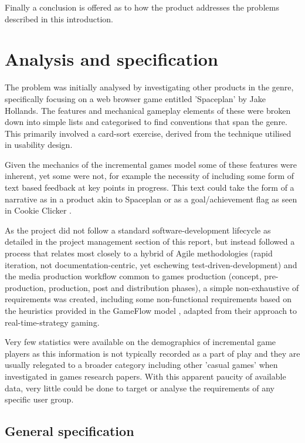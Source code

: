 \documentclass[twoside]{bhamthesis}
\begin{document}
Finally a conclusion is offered as to how the product addresses the problems described in this introduction.

\section{Analysis and specification}

The problem was initially analysed by investigating other products in the genre, specifically focusing on a web browser game entitled 'Spaceplan' by Jake Hollands. The features and mechanical gameplay elements of these were broken down into simple lists and categorised to find conventions that span the genre. This primarily involved a card-sort exercise, derived from the technique utilised in usability design.

Given the mechanics of the incremental games model some of these features were inherent, yet some were not, for example the necessity of including some form of text based feedback at key points in progress. This text could take the form of a narrative as in a product akin to Spaceplan \cite{hollands_spaceplan_2017} or as a goal/achievement flag as seen in Cookie Clicker \cite{ortiel_cookie_2017}.

As the project did not follow a standard software-development lifecycle as detailed in the project management section of this report, but instead followed a process that relates most closely to a hybrid of Agile methodologies (rapid iteration, not documentation-centric, yet eschewing test-driven-development) and the media production workflow common to games production (concept, pre-production, production, post and distribution phases), a simple non-exhaustive of requirements was created, including some non-functional requirements based on the heuristics provided in the GameFlow model \cite{sweetser_gameflow_2012}, adapted from their approach to real-time-strategy gaming.

Very few statistics were available on the demographics of incremental game players as this information is not typically recorded as a part of play and they are usually relegated to a broader category including other 'casual games' when investigated in games research papers. With this apparent paucity of available data, very little could be done to target or analyse the requirements of any specific user group.

\subsection{General specification}
\end{document}
